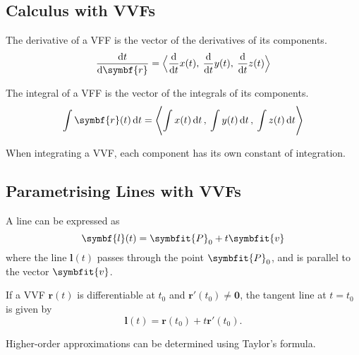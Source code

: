 \documentclass{article}
\begin{document}
\subsection{Calculus with VVFs}
\begin{theorem}
    The derivative of a VFF is the vector of the derivatives of its components.
    \begin{equation*}
        \dv{t}\symbf{r}(t) = \avec[\Big]{\dv{t}x(t),\: \dv{t}y(t),\: \dv{t}z(t)}
    \end{equation*}
\end{theorem}
\begin{theorem}
    The integral of a VFF is the vector of the integrals of its components.
    \begin{equation*}
        \int\symbf{r}(t)\dd{t}
        = \avec[\Bigg]{\int x(t) \dd{t},\: \int y(t) \dd{t},\: \int z(t) \dd{t}}
    \end{equation*}
\end{theorem}
\begin{remark}
    When integrating a VVF, each component has its own constant of integration.
\end{remark}
\subsection{Parametrising Lines with VVFs}
\begin{definition}
    A line can be expressed as
    \begin{equation*}
        \symbf{l}(t) = \symbfit{P}_0 + t\symbfit{v}
    \end{equation*}
    where the line $\symbf{l}(t)$ passes through the point $\symbfit{P}_0$, and is parallel to the vector $\symbfit{v}$.
\end{definition}
\begin{definition}
    If a VVF $\symbf{r}(t)$ is differentiable at
    $t_0$ and $\symbf{r'}(t_0)\ne\symbf{0}$, the tangent line at
    $t=t_0$ is given by
    \begin{equation*}
        \symbf{l}(t) = \symbf{r}(t_0)+t\symbf{r'}(t_0).
    \end{equation*}
\end{definition}
\begin{remark}
    Higher-order approximations can be determined using Taylor's formula.
\end{remark}
\end{document}
